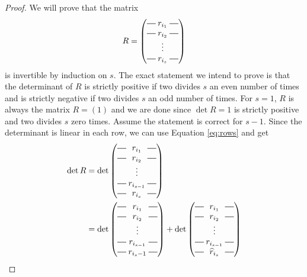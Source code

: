 \begin{proof}
  We will prove that the matrix
  \[ R = 
  \begin{pmatrix}
    \matrow{r_{i_1}} \\
    \matrow{r_{i_2}} \\
    & \hspace{-0.75em} \vdots & \\
    \matrow{r_{i_s}}
  \end{pmatrix}
  \]
  is invertible by induction on $s$. The exact statement we intend to
  prove is that the determinant of $R$ is strictly positive if two
  divides $s$ an even number of times and is strictly negative if
  two divides $s$ an odd number of times.
  For $s = 1$, $R$ is always the matrix $R = \left( 1 \right)$ and we
  are done since $\det R = 1$ is strictly positive and two divides $s$
  zero times.
  Assume the statement is correct for $s-1$. Since the determinant is
  linear in each row, we can use Equation \ref{eq:rows} and get
  \begin{align*}
    \det{R} &= 
              \det\begin{pmatrix}
                \matrow{r_{i_1}} \\
                \matrow{r_{i_2}} \\
                & \hspace{-0.75em} \vdots & \\
                \matrow{r_{i_{s-1}}} \\
                \matrow{r_{i_s}}
              \end{pmatrix} \\
            &= 
              \det\begin{pmatrix}
                \matrow{r_{i_1}} \\
                \matrow{r_{i_2}} \\
                & \hspace{-0.75em} \vdots & \\
                \matrow{r_{i_{s-1}}} \\
                \matrow{r_{i_s-1}}
              \end{pmatrix}+
    \det\begin{pmatrix}
      \matrow{r_{i_1}} \\
      \matrow{r_{i_2}} \\
      & \hspace{-0.75em} \vdots & \\
      \matrow{r_{i_{s-1}}} \\
      \matrow{\widehat{r}_{i_s}}
    \end{pmatrix} \\

\end{align*}
\end{proof}
